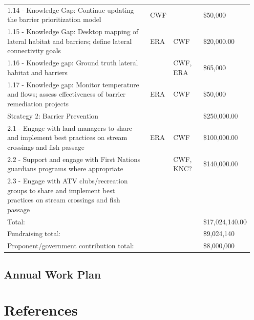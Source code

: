 \documentclass[
  letterpaper,
  DIV=11,
  numbers=noendperiod]{scrreprt}
\begin{document}
\begin{longtable}[]{@{}llll@{}}
1.14 - Knowledge Gap: Continue updating the barrier prioritization model
& CWF & & \$50,000 \\
1.15 - Knowledge Gap: Desktop mapping of lateral habitat and barriers;
define lateral connectivity goals & ERA & CWF & \$20,000.00 \\
1.16 - Knowledge gap: Ground truth lateral habitat and barriers & & CWF,
ERA & \$65,000 \\
1.17 - Knowledge gap: Monitor temperature and flows; assess
effectiveness of barrier remediation projects & ERA & CWF & \$50,000 \\
Strategy 2: Barrier Prevention & & & \$250,000.00 \\
2.1 - Engage with land managers to share and implement best practices on
stream crossings and fish passage & ERA & CWF & \$100,000.00 \\
2.2 - Support and engage with First Nations guardians programs where
appropriate & & CWF, KNC? & \$140,000.00 \\
2.3 - Engage with ATV clubs/recreation groups to share and implement
best practices on stream crossings and fish passage & & & \\
Total: & & & \$17,024,140.00 \\
Fundraising total: & & & \$9,024,140 \\
Proponent/government contribution total: & & & \$8,000,000 \\

\end{longtable}

\section*{Annual Work Plan}\label{annual-work-plan}



\chapter*{References}\label{references}

\end{document}
